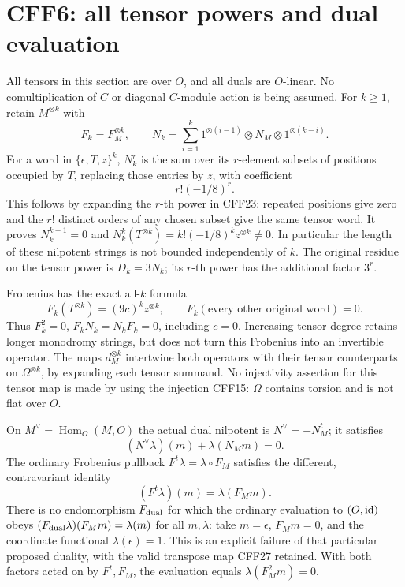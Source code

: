 \section{CFF6: all tensor powers and dual evaluation}
All tensors in this section are over \(O\), and all duals are
\(O\)-linear. No comultiplication of \(C\) or diagonal
\(C\)-module action is being assumed.
For \(k\ge1\), retain \(M^{\otimes k}\) with
\[
 F_k=F_M^{\otimes k},\qquad
 N_k=\sum_{i=1}^k1^{\otimes(i-1)}\otimes N_M\otimes
                       1^{\otimes(k-i)} .
 \tag{CFF23}
\]
For a word in \(\{\epsilon,T,z\}^k\), \(N_k^r\) is the sum over
its \(r\)-element subsets of positions occupied by \(T\),
replacing those entries by \(z\), with coefficient
\[
                         r!(-1/8)^r .
 \tag{CFF24}
\]
This follows by expanding the \(r\)-th power in CFF23: repeated
positions give zero and the \(r!\) distinct orders of any
chosen subset give the same tensor word. It proves
\(N_k^{k+1}=0\) and \(N_k^k(T^{\otimes k})=
k!(-1/8)^k z^{\otimes k}\ne0\). In particular the length
of these nilpotent strings is not bounded independently of \(k\).
The original residue on the tensor power is \(D_k=3N_k\);
its \(r\)-th power has the additional factor \(3^r\).

Frobenius has the exact all-\(k\) formula
\[
 F_k(T^{\otimes k})=(9c)^kz^{\otimes k},\qquad
 F_k(\text{every other original word})=0.
 \tag{CFF25}
\]
Thus \(F_k^2=0\), \(F_kN_k=N_kF_k=0\), including \(c=0\).
Increasing tensor degree retains longer monodromy strings,
but does not turn this Frobenius into an invertible operator.
The maps \(d_M^{\otimes k}\) intertwine both operators with
their tensor counterparts on \(\Omega^{\otimes k}\), by
expanding each tensor summand. No injectivity assertion for
this tensor map is made by using the injection CFF15:
\(\Omega\) contains torsion and is not flat over \(O\).

On \(M^\vee=\operatorname{Hom}_O(M,O)\) the actual dual
nilpotent is \(N^\vee=-N_M^t\); it satisfies
\[
 (N^\vee\lambda)(m)+\lambda(N_Mm)=0 .
 \tag{CFF26}
\]
The ordinary Frobenius pullback \(F^t\lambda=\lambda\circ F_M\)
satisfies the different, contravariant identity
\[
 (F^t\lambda)(m)=\lambda(F_Mm).
 \tag{CFF27}
\]
There is no endomorphism \(F_{\rm dual}\) for which the
ordinary evaluation to \((O,\operatorname{id})\) obeys
\((F_{\rm dual}\lambda)(F_Mm)=\lambda(m)\) for all \(m,\lambda\):
take \(m=\epsilon\), \(F_Mm=0\), and the coordinate functional
\(\lambda(\epsilon)=1\). This is an explicit failure of that
particular proposed duality, with the valid transpose map
CFF27 retained. With both factors acted on by \(F^t,F_M\),
the evaluation equals \(\lambda(F_M^2m)=0\).

